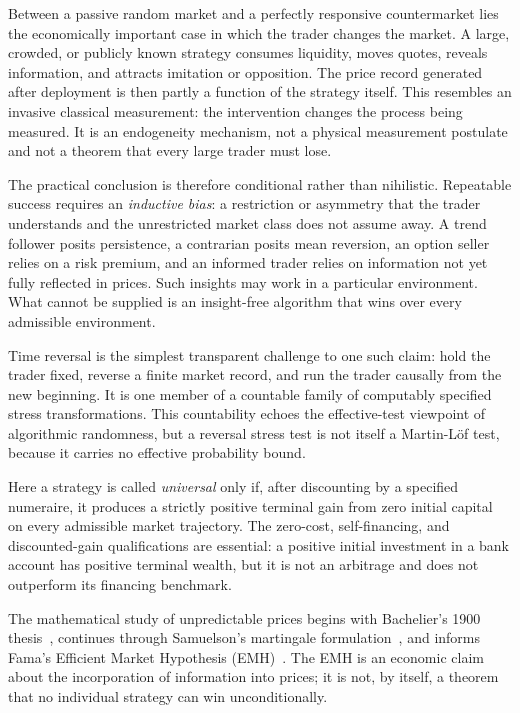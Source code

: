 \documentclass[aps,pra,reprint,superscriptaddress,amsmath,amssymb,floatfix]{revtex4-2}
\theoremstyle{plain}
\theoremstyle{definition}
\theoremstyle{remark}
\begin{document}
Between a passive random market and a perfectly responsive countermarket lies
the economically important case in which the trader changes the market. A
large, crowded, or publicly known strategy consumes liquidity, moves quotes,
reveals information, and attracts imitation or opposition. The price record
generated after deployment is then partly a function of the strategy itself.
This resembles an invasive classical measurement: the intervention changes
the process being measured. It is an endogeneity mechanism, not a physical
measurement postulate and not a theorem that every large trader must lose.

The practical conclusion is therefore conditional rather than nihilistic.
Repeatable success requires an \emph{inductive bias}: a restriction or
asymmetry that the trader understands and the unrestricted market class does
not assume away. A trend follower posits persistence, a contrarian posits mean
reversion, an option seller relies on a risk premium, and an informed trader
relies on information not yet fully reflected in prices. Such insights may
work in a particular environment. What cannot be supplied is an insight-free
algorithm that wins over every admissible environment.

Time reversal is the simplest transparent challenge to one such claim: hold
the trader fixed, reverse a finite market record, and run the trader causally
from the new beginning. It is one member of a countable family of computably
specified stress transformations. This countability echoes the effective-test
viewpoint of algorithmic randomness, but a reversal stress test is not itself
a Martin-L\"of test, because it carries no effective probability bound.

Here a strategy is called \emph{universal} only if, after discounting by a
specified numeraire, it produces a strictly positive terminal gain from zero
initial capital on every admissible market trajectory. The zero-cost,
self-financing, and discounted-gain qualifications are essential: a positive
initial investment in a bank account has positive terminal wealth, but it is
not an arbitrage and does not outperform its financing benchmark.

The mathematical study of unpredictable prices begins with Bachelier's 1900
thesis~\cite{Bachelier1900}, continues through Samuelson's martingale
formulation~\cite{Samuelson1965}, and informs Fama's Efficient Market
Hypothesis (EMH)~\cite{Fama1970}. The EMH is an economic claim about the
incorporation of information into prices; it is not, by itself, a theorem that
no individual strategy can win unconditionally.
\end{document}
